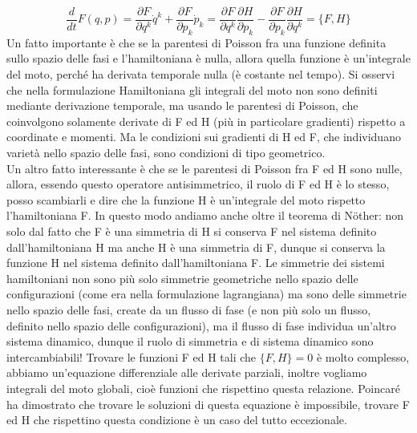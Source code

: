 \documentclass[
10pt, %
a4paper, %
oneside, %
headinclude,footinclude, %
BCOR5mm, %
]{scrartcl}
\begin{document}
\[\frac{d}{dt}F(q, p) = \frac{\partial F}{\partial q^k}\dot{q}^k+\frac{\partial F}{\partial p_k}\dot{p}_k=
 \frac{\partial F}{\partial q^k}\frac{\partial H}{\partial p_k}-\frac{\partial F}{\partial p_k}\frac{\partial H}{\partial q^k} =\{F, H\}\]
Un fatto importante è che se la parentesi di Poisson fra una funzione definita sullo spazio delle fasi e l'hamiltoniana è nulla, allora quella funzione è un'integrale del moto, perché ha derivata temporale nulla (è costante nel tempo). Si osservi che nella formulazione Hamiltoniana gli integrali del moto non sono definiti mediante derivazione temporale, ma usando le parentesi di Poisson, che coinvolgono solamente derivate di F ed H (più in particolare gradienti) rispetto a coordinate e momenti. Ma le condizioni sui gradienti di H ed F, che individuano varietà nello spazio delle fasi, sono condizioni di tipo geometrico.\\
Un altro fatto interessante è che se le parentesi di Poisson fra F ed H sono nulle, allora, essendo questo operatore antisimmetrico, il ruolo di F ed H è lo stesso, posso scambiarli e dire che la funzione H è un'integrale del moto rispetto l'hamiltoniana F. In questo modo andiamo anche oltre il teorema di N\"{o}ther: non solo dal fatto che F è una simmetria di H si conserva F nel sistema definito dall'hamiltoniana H ma anche H è una simmetria di F, dunque si conserva la funzione H nel sistema definito dall'hamiltoniana F. Le simmetrie dei sistemi hamiltoniani non sono più solo simmetrie geometriche nello spazio delle configurazioni (come era nella formulazione lagrangiana) ma sono delle simmetrie nello spazio delle fasi, create da un flusso di fase (e non più solo un flusso, definito nello spazio delle configurazioni), ma il flusso di fase individua un'altro sistema dinamico, dunque il ruolo di simmetria e di sistema dinamico sono intercambiabili!
Trovare le funzioni F ed H tali che \(\{F, H\} = 0\) è molto complesso, abbiamo un'equazione differenziale alle derivate parziali, inoltre vogliamo integrali del moto globali, cioè funzioni che rispettino questa relazione. Poincaré ha dimostrato che trovare le soluzioni di questa equazione è impossibile, trovare F ed H che rispettino questa condizione è un caso del tutto eccezionale.\\\\
\end{document}
